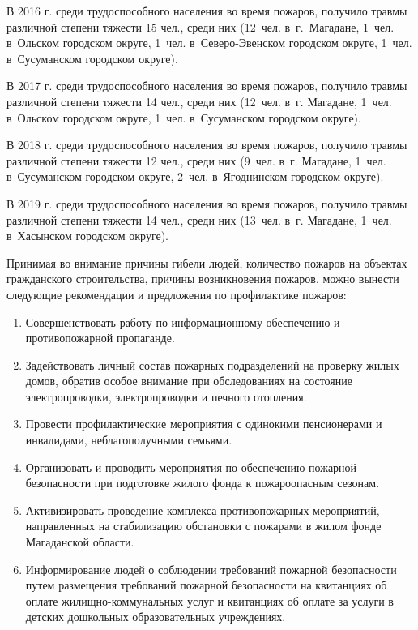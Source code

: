 В 2016 г. среди трудоспособного населения во время пожаров, получило травмы различной степени тяжести 15 чел., среди них (12~чел. в~г.~Магадане, 1~чел. в~Ольском городском округе, 1~чел. в~Северо-Эвенском городском округе, 1~чел. в~Сусуманском городском округе).

В 2017 г. среди трудоспособного населения во время пожаров, получило травмы различной степени тяжести 14 чел., среди них (12~чел. в~г. Магадане, 1~чел. в~Ольском городском округе, 1~чел. в~Сусуманском городском округе).

В 2018 г. среди трудоспособного населения во время пожаров, получило травмы различной степени тяжести 12 чел., среди них (9~чел. в~г. Магадане, 1~чел. в~Сусуманском городском округе, 2~чел. в~Ягоднинском городском округе).

В 2019 г. среди трудоспособного населения во время пожаров, получило травмы различной степени тяжести 14 чел., среди них (13~чел. в~г. Магадане, 1~чел. в~Хасынском городском округе).

Принимая во внимание причины гибели людей, количество пожаров на объектах гражданского строительства, причины возникновения пожаров, можно вынести следующие рекомендации и предложения по профилактике пожаров:
\begin{enumerate}[noitemsep]\vspace{-8pt}
  \item Совершенствовать работу по информационному обеспечению и противопожарной пропаганде.
  \item Задействовать личный состав пожарных подразделений на проверку жилых домов, обратив особое внимание при обследованиях на состояние электропроводки, электропроводки и печного отопления.
  \item Провести профилактические мероприятия с одинокими пенсионерами и инвалидами, неблагополучными семьями.
  \item Организовать и проводить мероприятия по обеспечению пожарной безопасности при подготовке жилого фонда к пожароопасным сезонам.
  \item Активизировать проведение комплекса противопожарных мероприятий, направленных на стабилизацию обстановки с пожарами в жилом фонде Магаданской области.
  \item Информирование людей о соблюдении требований пожарной безопасности путем размещения требований пожарной безопасности на квитанциях об оплате жилищно-коммунальных услуг и квитанциях об оплате за услуги в детских дошкольных образовательных учреждениях.
\end{enumerate}
\vspace{-8pt}

